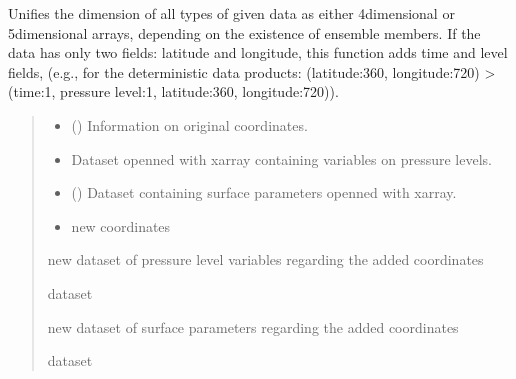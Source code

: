 \documentclass[a4paper,11pt,english]{sphinxmanual}
\begin{document}
\begin{fulllineitems}
\label{\detokenize{modules:envlib.extend_dim.extend_dimensions}}
\pysigstartsignatures
{}
\pysigstopsignatures
\sphinxAtStartPar
Unifies the dimension of all types of given data as either 4\sphinxhyphen{}dimensional or 5\sphinxhyphen{}dimensional arrays, depending on
the existence of ensemble members. If the data has only two fields: latitude and longitude, this function
adds time and level fields, (e.g., for the deterministic data products: (latitude:360, longitude:720) \sphinxhyphen{}\textgreater{} (time:1, pressure level:1, latitude:360, longitude:720)).
\begin{quote}\begin{description}
\begin{itemize}
\item {} 
\sphinxAtStartPar
{} () \textendash{} Information on original coordinates.

\item {} 
\sphinxAtStartPar
{} \textendash{} Dataset openned with xarray containing variables on pressure levels.

\item {} 
\sphinxAtStartPar
{} () \textendash{} Dataset containing surface parameters openned with xarray.

\item {} 
\sphinxAtStartPar
{} \textendash{} new coordinates

\end{itemize}

\sphinxAtStartPar
new dataset of pressure level variables regarding the added coordinates

\sphinxAtStartPar
dataset

\sphinxAtStartPar
new dataset of surface parameters regarding the added coordinates

\sphinxAtStartPar
dataset

\end{description}\end{quote}

\end{fulllineitems}
\end{document}
